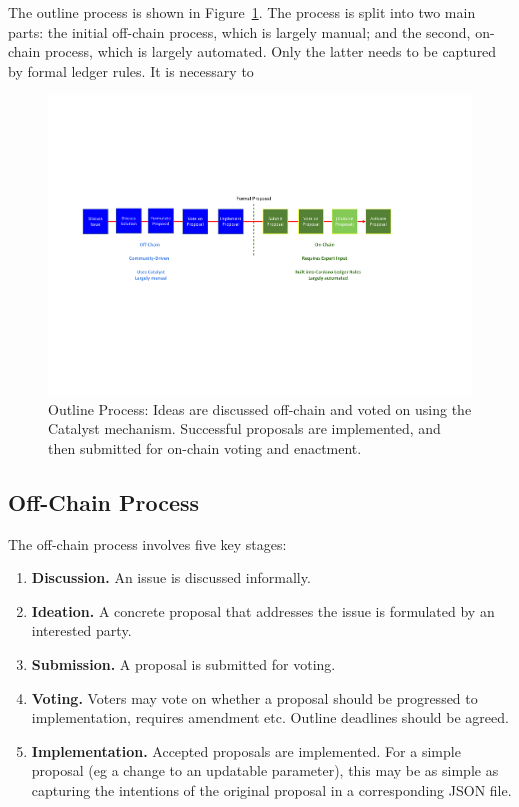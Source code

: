 The outline process is shown in Figure~\ref{fig:workflows}.   The process is split into two main parts: the initial off-chain process, which is largely manual; and the second, on-chain process, which is largely
automated.  Only the latter needs to be captured by formal ledger rules.  It is necessary to

\begin{figure}
  \includegraphics[trim=30 200 100 100,clip,width=\textwidth]{StoryBoard}
  \caption{Outline Process: Ideas are discussed off-chain and voted on using the Catalyst mechanism.  Successful proposals are implemented, and then submitted for on-chain voting and enactment.}
\label{fig:workflows}
\end{figure}


\subsection{Off-Chain Process}

The off-chain process involves five key stages:

\begin{enumerate}
\item
  \textbf{Discussion.}  An issue is discussed informally.
\item
  \textbf{Ideation.}  A concrete proposal that addresses the issue is formulated by an interested party.
\item
  \textbf{Submission.}  A proposal is submitted for voting.
\item
  \textbf{Voting.}  Voters may vote on whether a proposal should be progressed to implementation, requires amendment etc.  Outline deadlines should be agreed.
\item
  \textbf{Implementation.}  Accepted proposals are implemented.  For a simple proposal (eg a change to an updatable parameter), this may be as simple as capturing the intentions of the original proposal in a corresponding JSON file.
\end{enumerate}

